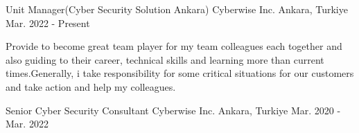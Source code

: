 
\begin{cventries}
  \cventry
    {Unit Manager(Cyber Security Solution Ankara)} %
    {Cyberwise Inc.} %
    {Ankara, Turkiye} %
    {Mar. 2022 - Present} %
    {
      \begin{cvparagraph} %
        Provide to become great team player for my team colleagues each together and also guiding to their career, technical skills and learning more than current times.Generally, i take responsibility for some critical situations for our customers and take action and help my colleagues.
      \end{cvparagraph}
    }

  \cventry
    {Senior Cyber Security Consultant} %
    {Cyberwise Inc.} %
    {Ankara, Turkiye} %
    {Mar. 2020 - Mar. 2022} %
    {

}
\end{cventries}
